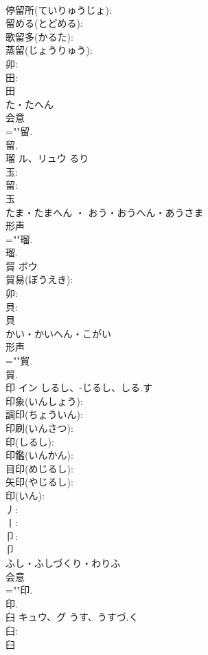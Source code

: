 \documentclass[8pt]{extreport}
\begin{document}
\begin{CJK}{UTF8}{min}
\\	停留所(ていりゅうじょ): 
\\	留める(とどめる): 
\\	歌留多(かるた): 
\\	蒸留(じょうりゅう): 
\\	卯: 
\\	田: 
\\	田	
\\	た・たへん	
\\	会意 
\\	=""留.
\\	留.
\\	瑠	ル、リュウ		るり	
\\	玉: 
\\	留: 
\\	玉	
\\	たま・たまへん ・ おう・おうへん・あうさま	
\\	形声 
\\	=""瑠.
\\	瑠.
\\	貿	ボウ			
\\	貿易(ぼうえき): 
\\	卯: 
\\	貝: 
\\	貝	
\\	かい・かいへん・こがい	
\\	形声 
\\	=""貿.
\\	貿.
\\	印	イン	しるし、-じるし、しる.す		
\\	印象(いんしょう): 
\\	調印(ちょういん): 
\\	印刷(いんさつ): 
\\	印(しるし): 
\\	印鑑(いんかん): 
\\	目印(めじるし): 
\\	矢印(やじるし): 
\\	印(いん): 
\\	丿: 
\\	丨: 
\\	卩: 
\\	卩	
\\	ふし・ふしづくり・わりふ	
\\	会意 
\\	=""印.
\\	印.
\\	臼	キュウ、グ	うす、うすづ.く		
\\	臼: 
\\	臼	

\end{CJK}
\end{document}
